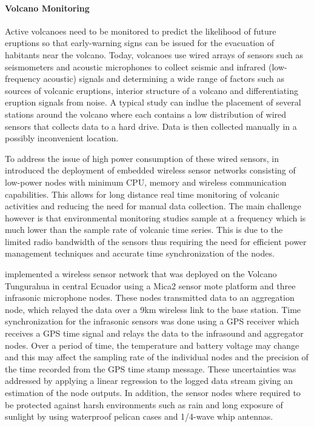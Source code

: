 \paragraph{Volcano Monitoring} Active volcanoes need to be monitored to predict the likelihood of future eruptions so that early-warning signs can be issued for the evacuation of habitants near the volcano. Today, volcanoes use wired arrays of sensors such as seismometers and acoustic microphones to collect seismic and infrared (low-frequency acoustic) signals and determining a wide range of factors such as sources of volcanic eruptions, interior structure of a volcano and differentiating eruption signals from noise. A typical study can indlue the placement of several stations around the volcano where each contains a low distribution of wired sensors that collects data to a hard drive. Data is then collected manually in a possibly inconvenient location.

To address the issue of high power consumption of these wired sensors, \citeauthor{Werner-Allen:2006:FYV:1298455.1298491} in \cite{Werner-Allen:2006:FYV:1298455.1298491} introduced the deployment of embedded wireless sensor networks consisting of low-power nodes with minimum CPU, memory and wireless communication capabilities. This allows for long distance real time monitoring of volcanic activities and reducing the need for manual data collection. The main challenge however is that environmental monitoring studies sample at a frequency which is much lower than the sample rate of volcanic time series. This is due to the limited radio bandwidth of the sensors thus requiring the need for efficient power management techniques and accurate time synchronization of the nodes. 

\citeauthor{Werner-Allen:2006:FYV:1298455.1298491} implemented a wireless sensor network that was deployed on the Volcano Tungurahua in central Ecuador using a Mica2 sensor mote platform and three infrasonic microphone nodes. These nodes transmitted data to an aggregation node, which relayed the data over a 9km wireless link to the base station. Time synchronization for the infrasonic sensors was done using a GPS receiver which receives a GPS time signal and relays the data 
to the infrasound and aggregator nodes. Over a period of time, the temperature and battery voltage may change and this may affect the sampling rate of the individual nodes and the precision of the time recorded from the GPS time stamp message. These uncertainties was addressed by applying a linear regression to the logged data stream giving an estimation of the node outputs. In addition, the sensor nodes where required to be protected against harsh environments such as rain and long exposure of sunlight by using waterproof pelican cases and 1/4-wave whip antennas.

